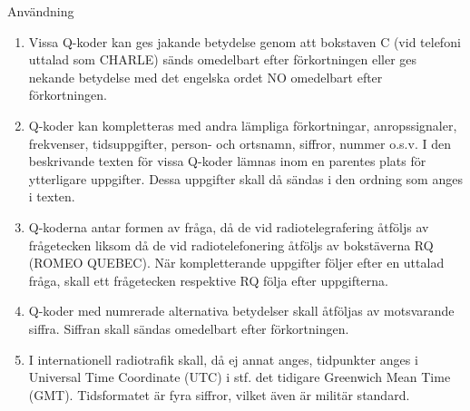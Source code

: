 Användning
\begin{enumerate}
\item Vissa Q-koder kan ges jakande betydelse genom att bokstaven C
  (vid telefoni uttalad som CHARLE) sänds omedelbart efter
  förkortningen eller ges nekande betydelse med det engelska ordet NO
  omedelbart efter förkortningen.
\item Q-koder kan kompletteras med andra lämpliga förkortningar,
  anropssignaler, frekvenser, tidsuppgifter, person- och ortsnamn,
  siffror, nummer o.s.v. I den beskrivande texten för vissa Q-koder
  lämnas inom en parentes plats för ytterligare uppgifter. Dessa
  uppgifter skall då sändas i den ordning som anges i texten.
\item Q-koderna antar formen av fråga, då de vid radiotelegrafering
  åtföljs av frågetecken liksom då de vid radiotelefonering åtföljs av
  bokstäverna RQ (ROMEO QUEBEC). När kompletterande uppgifter följer
  efter en uttalad fråga, skall ett frågetecken respektive RQ följa
  efter uppgifterna.
\item Q-koder med numrerade alternativa betydelser skall åtföljas av
  motsvarande siffra. Siffran skall sändas omedelbart efter
  förkortningen.
\item I internationell radiotrafik skall, då ej annat anges,
  tidpunkter anges i Universal Time Coordinate (UTC) i stf. det
  tidigare Greenwich Mean Time (GMT). Tidsformatet är fyra siffror,
  vilket även är militär standard.
\end{enumerate}

